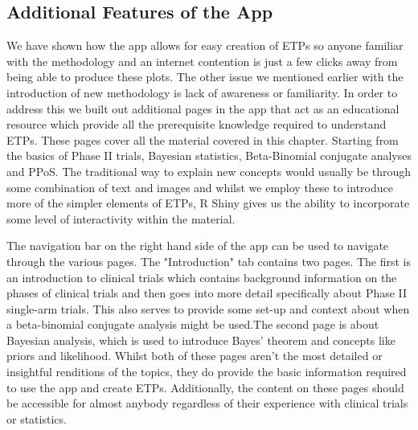 \subsection{Additional Features of the App}

We have shown how the app allows for easy creation of ETPs so anyone familiar with the methodology and an internet contention is just a few clicks away from being able to produce these plots. The other issue we mentioned earlier with the introduction of new methodology is lack of awareness or familiarity. In order to address this we built out additional pages in the app that act as an educational resource which provide all the prerequisite knowledge required to understand ETPs. These pages cover all the material covered in this chapter. Starting from the basics of Phase \RN{2} trials, Bayesian statistics, Beta-Binomial conjugate analyses and PPoS. The traditional way to explain new concepts would usually be through some combination of text and images and whilst we employ these to introduce more of the simpler elements of ETPs, R Shiny gives us the ability to incorporate some level of interactivity within the material. 

The navigation bar on the right hand side of the app can be used to navigate through the various pages. The "Introduction" tab contains two pages. The first is an introduction to clinical trials which contains background information on the phases of clinical trials and then goes into more detail specifically about Phase \RN{2} single-arm trials. This also serves to provide some set-up and context about when a beta-binomial conjugate analysis might be used.The second page is about Bayesian analysis, which is used to introduce Bayes' theorem and concepts like priors and likelihood. Whilst both of these pages aren't the most detailed or insightful renditions of the topics, they do provide the basic information required to use the app and create ETPs. Additionally, the content on these pages should be accessible for almost anybody regardless of their experience with clinical trials or statistics. 


